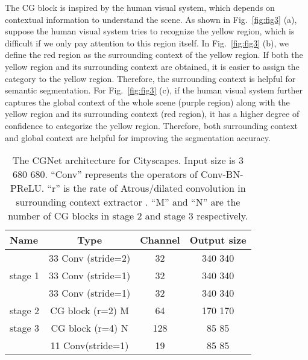 \documentclass[10pt,twocolumn,letterpaper]{article}
\begin{document}
The CG block is inspired by the human visual system, which depends on contextual information to understand the scene.
As shown in Fig.~\ref{fig:fig3} (a), suppose the human visual system tries to recognize the yellow region, which is difficult if we only pay attention to this region itself.
In Fig.~\ref{fig:fig3} (b), we define the red region as the surrounding context of the yellow region. If both the yellow region and its surrounding context are obtained, it is easier to assign the category to the yellow region. Therefore, the surrounding context is helpful for semantic segmentation.
For Fig.~\ref{fig:fig3} (c), if the human visual system further captures the global context of the whole scene (purple region) along with the yellow region and its surrounding context (red region), it has a higher degree of confidence to categorize the yellow region. Therefore, both surrounding context and global context are helpful for improving the segmentation accuracy.

\begin{table}[t]
\begin{center}
\begin{tabular}{|lccc|}
\hline
Name  & {Type} &  Channel & {Output size} \\
\hline\hline
 &  33 Conv (stride=2) & 32    & 340  340   \\
stage 1 &  33 Conv (stride=1) & 32 & 340  340   \\
&  33 Conv (stride=1) & 32  & 340 340   \\
\hline
stage 2  &  CG block (r=2)   {M} & 64 &170  170   \\
\hline
stage 3   &  CG block (r=4)  {N}  & 128  & 85  85   \\
\hline
         & 11 Conv(stride=1)  & 19 & 85  85 \\
\hline
\end{tabular}
\end{center}
\caption{The CGNet architecture for Cityscapes. Input size is 3  680  680. ``Conv'' represents the operators of Conv-BN-PReLU. ``r'' is the rate of Atrous/dilated convolution in surrounding context extractor . ``M'' and ``N'' are the number of CG blocks in stage 2 and stage 3 respectively.}
\label{table:tab1}
\vspace{-10pt}
\end{table}
\end{document}
